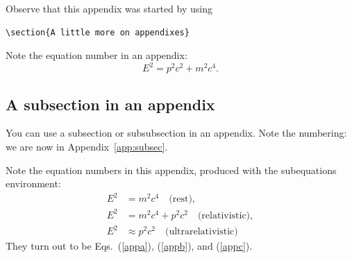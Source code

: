 \documentclass[]{article}
\begin{document}
Observe that this appendix was started by using
\begin{verbatim}
\section{A little more on appendixes}
\end{verbatim}

Note the equation number in an appendix:
\begin{equation}
  E^2=p^2c^2 + m^2c^4.
\end{equation}

\subsection{\label{app:subsec}A subsection in an appendix}

You can use a subsection or subsubsection in an appendix. Note the
numbering: we are now in Appendix~\ref{app:subsec}.

Note the equation numbers in this appendix, produced with the
subequations environment:
\begin{subequations}
\begin{align}
  E^2 &= m^2c^4 \quad \text{(rest)}, \label{appa} \\
  E^2 &= m^2c^4 + p^2 c^2 \quad \text{(relativistic)}, \label{appb} \\
  E^2 &\approx p^2 c^2 \quad \text{(ultrarelativistic)} \label{appc}
\end{align}
\end{subequations}
They turn out to be Eqs.~(\ref{appa}), (\ref{appb}), and (\ref{appc}).
\end{document}
